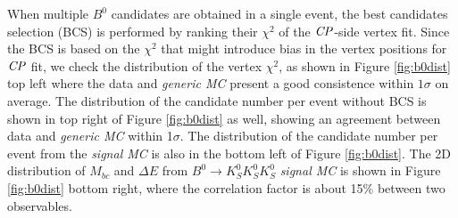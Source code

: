 When multiple $B^0$ candidates are obtained in a single event, the best candidates selection (BCS) is performed by ranking their $\chi^2$ of the $\it{CP}$-side vertex fit. Since the BCS is based on the $\chi^2$ that might introduce bias in the vertex positions for $\it{CP}$ fit, we check the distribution of the vertex $\chi^2$, as shown in Figure \ref{fig:b0dist} top left where the data and \textit{generic MC} present a good consistence within $1\sigma$ on average. The distribution of the candidate number per event without BCS is shown in top right of Figure \ref{fig:b0dist} as well, showing an agreement between data and \textit{generic MC} within 1$\sigma$. The distribution of the candidate number per event from the \textit{signal MC} is also in the bottom left of Figure \ref{fig:b0dist}. The 2D distribution of $M_{bc}$ and $\Delta E$ from $B^0 \to K_S^0  K_S^0  K_S^0$ \textit{signal MC} is shown in Figure \ref{fig:b0dist}  bottom right, where the correlation factor is about 15\% between two observables. 
 
